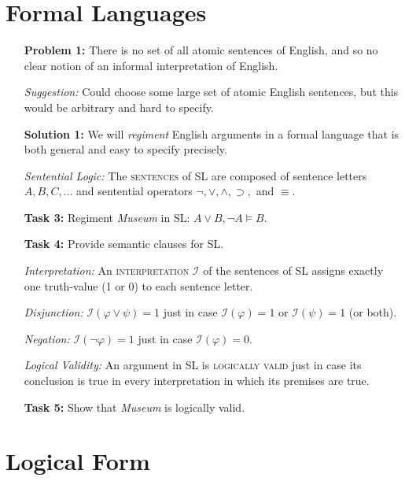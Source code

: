 \documentclass[a4paper, 11pt]{article} %
\newcommand{\I}{\mathcal{I}}
\begin{document}
\section*{Formal Languages}

\begin{enumerate}[leftmargin=1.2in,labelsep=.15in] %
  \item[\bf Problem 1:] There is no set of all atomic sentences of English, and so no clear notion of an informal interpretation of English.
  \item[\it Suggestion:] Could choose some large set of atomic English sentences, but this would be arbitrary and hard to specify.
  \item[\bf Solution 1:] We will \textit{regiment} English arguments in a formal language that is both general and easy to specify precisely.
  \item[\it Sentential Logic:] The \textsc{sentences} of SL are composed of sentence letters $A, B, C, \ldots$ and sentential operators $\neg,\vee,\wedge,\supset,$ and $\equiv$.
  \item[\bf Task 3:] Regiment \textit{Museum} in SL: $A\vee B, \neg A \vDash B$.
  \item[\bf Task 4:] Provide semantic clauses for SL.
  \item[\it Interpretation:] An \textsc{interpretation} $\I$ of the sentences of SL assigns exactly one truth-value (1 or 0) to each sentence letter.
  \item[\it Disjunction:] $\I(\varphi\vee\psi)=1$ just in case $\I(\varphi)=1$ or $\I(\psi)=1$ (or both).
  \item[\it Negation:] $\I(\neg\varphi)=1$ just in case $\I(\varphi)=0$.
  \item[\it Logical Validity:] An argument in SL is \textsc{logically valid} just in case its conclusion is true in every interpretation in which its premises are true.
  \item[\bf Task 5:] Show that \textit{Museum} is logically valid.
\end{enumerate}




\section*{Logical Form}
\end{document}
